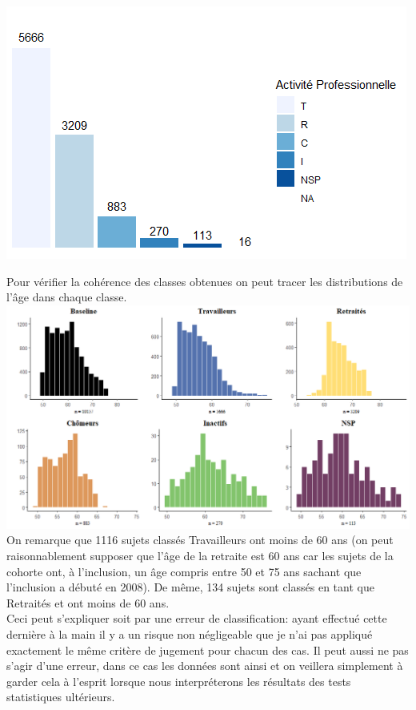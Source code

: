 \documentclass{book}
\begin{document}
\begin{center}
\includegraphics[scale=.8]{activpro_barplot_manuel.png}
\end{center}

\noindent
Pour vérifier la cohérence des classes obtenues on peut tracer les distributions de l'âge dans chaque classe.\\

\includegraphics[scale=.5]{plot_grid_hist_age_activproBis.png}\\
\noindent
On remarque que 1116 sujets classés Travailleurs ont moins de 60 ans (on peut raisonnablement supposer que l'âge de la retraite est 60 ans car les sujets de la cohorte ont, à l'inclusion, un âge compris entre 50 et 75 ans sachant que l'inclusion a débuté en 2008).
De même, 134 sujets sont classés en tant que Retraités et ont moins de 60 ans.\\
\noindent
Ceci peut s'expliquer soit par une erreur de classification: ayant effectué cette dernière à la main il y a un risque non négligeable que je n'ai pas appliqué exactement le même critère de jugement pour chacun des cas. Il peut aussi ne pas s'agir d'une erreur, dans ce cas les données sont ainsi et on veillera simplement à garder cela à l'esprit lorsque nous interpréterons les résultats des tests statistiques ultérieurs.
\end{document}

